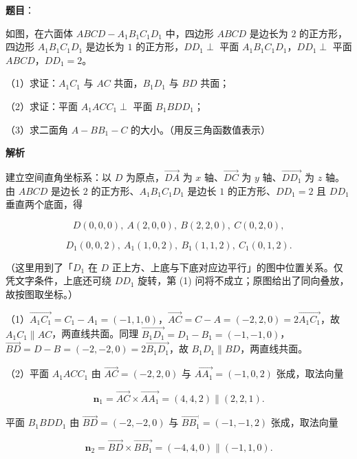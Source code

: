 \begin{answer}

\textbf{题目}：

如图，在六面体 $ABCD-A_1B_1C_1D_1$ 中，四边形 $ABCD$ 是边长为 $2$ 的正方形，四边形 $A_1B_1C_1D_1$ 是边长为 $1$ 的正方形，$DD_1\perp$ 平面 $A_1B_1C_1D_1$，$DD_1\perp$ 平面 $ABCD$，$DD_1=2$。
\nopagebreak[4]
\begin{center}\end{center}
\nopagebreak[4]
（1）求证：$A_1C_1$ 与 $AC$ 共面，$B_1D_1$ 与 $BD$ 共面；

（2）求证：平面 $A_1ACC_1\perp$ 平面 $B_1BDD_1$；

（3）求二面角 $A-BB_1-C$ 的大小。（用反三角函数值表示）

\textbf{解析}

建立空间直角坐标系：以 $D$ 为原点，$\overrightarrow{DA}$ 为 $x$ 轴、$\overrightarrow{DC}$ 为 $y$ 轴、$\overrightarrow{DD_1}$ 为 $z$ 轴。由 $ABCD$ 是边长 $2$ 的正方形、$A_1B_1C_1D_1$ 是边长 $1$ 的正方形、$DD_1=2$ 且 $DD_1$ 垂直两个底面，得

\nopagebreak[4]
\[D(0,0,0),\ A(2,0,0),\ B(2,2,0),\ C(0,2,0),\]

\nopagebreak[4]
\[D_1(0,0,2),\ A_1(1,0,2),\ B_1(1,1,2),\ C_1(0,1,2).\]

（这里用到了「$D_1$ 在 $D$ 正上方、上底与下底对应边平行」的图中位置关系。仅凭文字条件，上底还可绕 $DD_1$ 旋转，第 (1) 问将不成立；原图给出了同向叠放，故按图取坐标。）

（1）$\overrightarrow{A_1C_1}=C_1-A_1=(-1,1,0)$，$\overrightarrow{AC}=C-A=(-2,2,0)=2\overrightarrow{A_1C_1}$，故 $A_1C_1\parallel AC$，两直线共面。同理 $\overrightarrow{B_1D_1}=D_1-B_1=(-1,-1,0)$，$\overrightarrow{BD}=D-B=(-2,-2,0)=2\overrightarrow{B_1D_1}$，故 $B_1D_1\parallel BD$，两直线共面。

（2）平面 $A_1ACC_1$ 由 $\overrightarrow{AC}=(-2,2,0)$ 与 $\overrightarrow{AA_1}=(-1,0,2)$ 张成，取法向量

\nopagebreak[4]
\[\boldsymbol n_1=\overrightarrow{AC}\times\overrightarrow{AA_1}=(4,4,2)\parallel(2,2,1).\]

平面 $B_1BDD_1$ 由 $\overrightarrow{BD}=(-2,-2,0)$ 与 $\overrightarrow{BB_1}=(-1,-1,2)$ 张成，取法向量

\nopagebreak[4]
\[\boldsymbol n_2=\overrightarrow{BD}\times\overrightarrow{BB_1}=(-4,4,0)\parallel(-1,1,0).\]


\end{answer}
